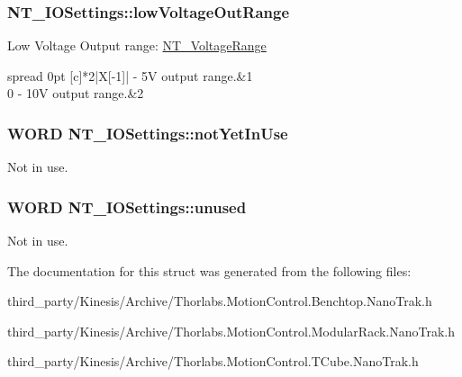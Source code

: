 \subsubsection[{\texorpdfstring{low\+Voltage\+Out\+Range}{lowVoltageOutRange}}]{ N\+T\+\_\+\+I\+O\+Settings\+::low\+Voltage\+Out\+Range}\hypertarget{struct_n_t___i_o_settings_ac21219e77c0adb8b3bb99c812b7059fe}{}\label{struct_n_t___i_o_settings_ac21219e77c0adb8b3bb99c812b7059fe}


Low Voltage Output range\+: \hyperlink{group___common_ga4bade700cfdb3b3ac039a82c1df53cf7}{N\+T\+\_\+\+Voltage\+Range} \tabulinesep=1mm
\begin{longtabu} spread 0pt [c]{*2{|X[-1]}|}
 -\/ 5V output range.&1 \\
0 -\/ 10V output range.&2 \\
\end{longtabu}


\subsubsection[{\texorpdfstring{not\+Yet\+In\+Use}{notYetInUse}}]{\setlength{\rightskip}{0pt plus 5cm}W\+O\+RD N\+T\+\_\+\+I\+O\+Settings\+::not\+Yet\+In\+Use}\hypertarget{struct_n_t___i_o_settings_a150818dada132ad52e0f18d8ff0e28cb}{}\label{struct_n_t___i_o_settings_a150818dada132ad52e0f18d8ff0e28cb}


Not in use. 

\subsubsection[{\texorpdfstring{unused}{unused}}]{\setlength{\rightskip}{0pt plus 5cm}W\+O\+RD N\+T\+\_\+\+I\+O\+Settings\+::unused}\hypertarget{struct_n_t___i_o_settings_ad0e3459b6d62c276a0899be3d409d209}{}\label{struct_n_t___i_o_settings_ad0e3459b6d62c276a0899be3d409d209}


Not in use. 



The documentation for this struct was generated from the following files\+:\begin{DoxyCompactItemize}
\item 
third\+\_\+party/\+Kinesis/\+Archive/Thorlabs.\+Motion\+Control.\+Benchtop.\+Nano\+Trak.\+h\item 
third\+\_\+party/\+Kinesis/\+Archive/Thorlabs.\+Motion\+Control.\+Modular\+Rack.\+Nano\+Trak.\+h\item 
third\+\_\+party/\+Kinesis/\+Archive/Thorlabs.\+Motion\+Control.\+T\+Cube.\+Nano\+Trak.\+h\end{DoxyCompactItemize}
